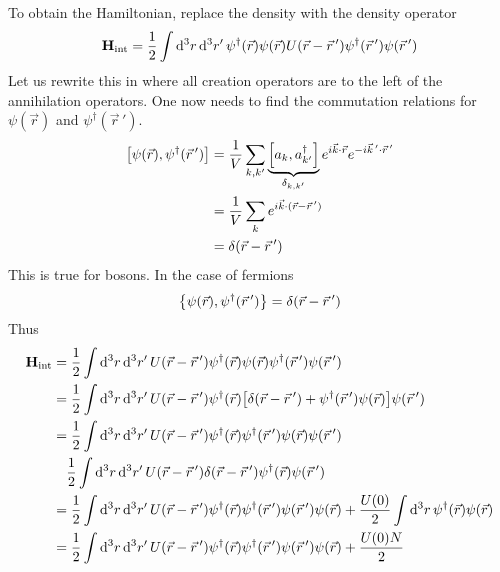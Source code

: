 \documentclass[12pt,a4paper,titlepage]{article}
\newcommand{\trm}[1]{\textrm{#1}} %
\newcommand{\ul}[1]{\underline{\smash{#1}}} %
\begin{document}
To obtain the Hamiltonian, replace the density with the density operator
\begin{equation}
\vb{H}_{\trm{int}}=\frac{1}{2}\int\dd[3]{r}\dd[3]{r^{\prime}}\psi^{\dagger}(\vec{r})\psi(\vec{r})U(\vec{r}-\vec{r}\,')\psi^{\dagger}(\vec{r}\,')\psi(\vec{r}\,')
\end{equation}
Let us rewrite this in \ul{normal ordered form} where all creation operators are to the left of the annihilation operators. One now needs to find the commutation relations for $\psi(\vec{r})$ and $\psi^{\dagger}(\vec{r}\,')$.
\begin{equation}
\begin{aligned}
\comm{\psi(\vec{r})}{\psi^{\dagger}(\vec{r}\,')}&=\frac{1}{V}\sum_{k,k^{\prime}}\underbrace{\comm{a_{k}}{a_{k^{\prime}}^{\dagger}}}_{\delta_{k,k'}}e^{i\vec{k}\cdot\vec{r}}e^{-i\vec{k}\,'\cdot\vec{r}\,'}\\
&=\frac{1}{V}\sum_{k}e^{i\vec{k}\cdot(\vec{r}-\vec{r}\,')}\\
&=\delta(\vec{r}-\vec{r}\,')
\end{aligned}
\end{equation}
This is true for bosons. In the case of fermions
\begin{equation}
\acomm{\psi(\vec{r})}{\psi^{\dagger}(\vec{r}\,')}=\delta(\vec{r}-\vec{r}\,')
\end{equation}
Thus
\begin{equation}
\begin{aligned}
\vb{H}_{\trm{int}}&=\frac{1}{2}\int\dd[3]{r}\dd[3]{r'}U(\vec{r}-\vec{r}\,')\psi^{\dagger}(\vec{r})\psi(\vec{r})\psi^{\dagger}(\vec{r}\,')\psi(\vec{r}\,')\\
&=\frac{1}{2}\int\dd[3]{r}\dd[3]{r'}U(\vec{r}-\vec{r}\,')\psi^{\dagger}(\vec{r})\qty[\delta(\vec{r}-\vec{r}\,')+\psi^{\dagger}(\vec{r}\,')\psi(\vec{r})]\psi(\vec{r}\,')\\
&=\frac{1}{2}\int\dd[3]{r}\dd[3]{r'}U(\vec{r}-\vec{r}\,')\psi^{\dagger}(\vec{r})\psi^{\dagger}(\vec{r}\,')\psi(\vec{r})\psi(\vec{r}\,')\\
&\quad\frac{1}{2}\int\dd[3]{r}\dd[3]{r^{\prime}}U(\vec{r}-\vec{r}\,')\delta(\vec{r}-\vec{r}\,')\psi^{\dagger}(\vec{r})\psi(\vec{r}\,')\\
&=\frac{1}{2}\int\dd[3]{r}\dd[3]{r^{\prime}}U(\vec{r}-\vec{r}\,')\psi^{\dagger}(\vec{r})\psi^{\dagger}(\vec{r}\,')\psi(\vec{r}\,')\psi(\vec{r})+\frac{U(0)}{2}\int\dd[3]{r}\psi^{\dagger}(\vec{r})\psi(\vec{r})\\
&=\frac{1}{2}\int\dd[3]{r}\dd[3]{r^{\prime}}U(\vec{r}-\vec{r}\,')\psi^{\dagger}(\vec{r})\psi^{\dagger}(\vec{r}\,')\psi(\vec{r}\,')\psi(\vec{r})+\frac{U(0)N}{2}
\end{aligned}
\end{equation}
\end{document}
